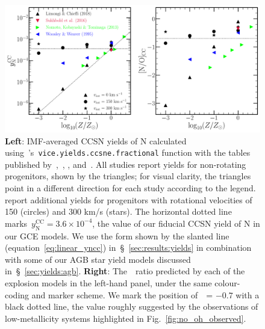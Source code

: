 \documentclass[ms.tex]{subfiles}
\begin{document}
\begin{figure} 
\centering 
\includegraphics[scale = 0.5]{n_cc_yields.pdf} 
\caption{
\textbf{Left}: IMF-averaged CCSN yields of N calculated 
using~\vice's~\texttt{vice.yields.ccsne.fractional} function with the tables 
published by~\citet[][blue]{Woosley1995},~\citet*[][green]{Nomoto2013}, 
\citet[][red]{Sukhbold2016}, and~\citet[][black]{Limongi2018}. 
All studies report yields for non-rotating progenitors, shown by the triangles; 
for visual clarity, the triangles point in a different direction for each 
study according to the legend. 
\citet{Limongi2018} report additional yields for progenitors with rotational 
velocities of 150 (circles) and 300 km/s (stars). 
The horizontal dotted line marks~$y_\text{N}^\text{CC} = 3.6\times10^{-4}$, the 
value of our fiducial CCSN yield of N in our GCE models. 
We use the form shown by the slanted line (equation~\ref{eq:linear_yncc}) 
in~\S~\ref{sec:results:yields} in combination with some of our AGB star yield 
models discussed in~\S~\ref{sec:yields:agb}. 
\textbf{Right}: The~\no~ratio predicted by each of the explosion models in 
the left-hand panel, under the same colour-coding and marker scheme. 
We mark the position of~\no~= $-0.7$ with a black dotted line, the value 
roughly suggested by the observations of low-metallicity systems highlighted in 
Fig.~\ref{fig:no_oh_observed}. 
}
\label{fig:n_cc_yields} 
\end{figure} 
\end{document}
